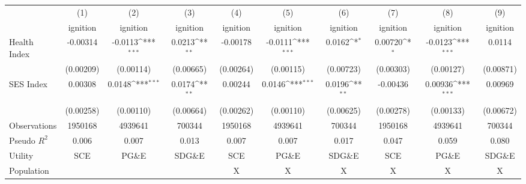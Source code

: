 {
\def\sym#1{\ifmmode^{#1}\else\(^{#1}\)\fi}
\begin{tabular}{l*{9}{c}}
\hline\hline
                    &\multicolumn{1}{c}{(1)}         &\multicolumn{1}{c}{(2)}         &\multicolumn{1}{c}{(3)}         &\multicolumn{1}{c}{(4)}         &\multicolumn{1}{c}{(5)}         &\multicolumn{1}{c}{(6)}         &\multicolumn{1}{c}{(7)}         &\multicolumn{1}{c}{(8)}         &\multicolumn{1}{c}{(9)}         \\
                    &    ignition         &    ignition         &    ignition         &    ignition         &    ignition         &    ignition         &    ignition         &    ignition         &    ignition         \\
\hline
Health Index        &    -0.00314         &     -0.0113\sym{***}&      0.0213\sym{**} &    -0.00178         &     -0.0111\sym{***}&      0.0162\sym{*}  &     0.00720\sym{*}  &     -0.0123\sym{***}&      0.0114         \\
                    &   (0.00209)         &   (0.00114)         &   (0.00665)         &   (0.00264)         &   (0.00115)         &   (0.00723)         &   (0.00303)         &   (0.00127)         &   (0.00871)         \\
[1em]
SES Index           &     0.00308         &      0.0148\sym{***}&      0.0174\sym{**} &     0.00244         &      0.0146\sym{***}&      0.0196\sym{**} &    -0.00436         &     0.00936\sym{***}&     0.00969         \\
                    &   (0.00258)         &   (0.00110)         &   (0.00664)         &   (0.00262)         &   (0.00110)         &   (0.00625)         &   (0.00278)         &   (0.00133)         &   (0.00672)         \\
\hline
Observations        &     1950168         &     4939641         &      700344         &     1950168         &     4939641         &      700344         &     1950168         &     4939641         &      700344         \\
Pseudo \(R^{2}\)    &       0.006         &       0.007         &       0.013         &       0.007         &       0.007         &       0.017         &       0.047         &       0.059         &       0.080         \\
Utility             &         SCE         &       PG\&E         &      SDG\&E         &         SCE         &       PG\&E         &      SDG\&E         &         SCE         &       PG\&E         &      SDG\&E         \\
Population          &                     &                     &                     &           X         &           X         &           X         &           X         &           X         &           X         \\

\end{tabular}}
